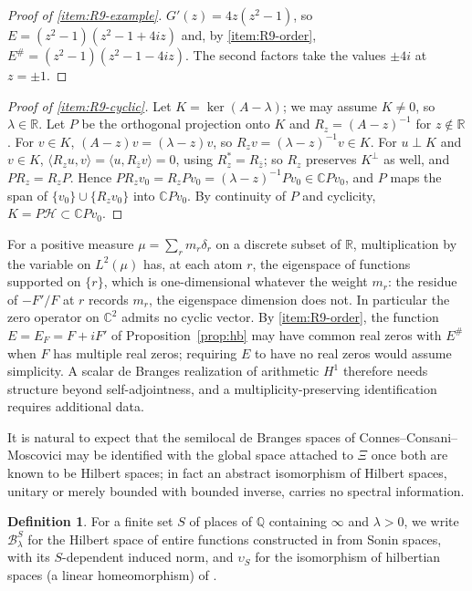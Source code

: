 \documentclass[11pt]{amsart}
\theoremstyle{plain}
\theoremstyle{definition}
\newtheorem{definition}[theorem]{Definition}
\theoremstyle{remark}
\numberwithin{equation}{section}
\newcommand{\C}{\mathbb{C}}
\newcommand{\R}{\mathbb{R}}
\newcommand{\Q}{\mathbb{Q}}
\newcommand{\cH}{\mathscr{H}}
\begin{document}
\begin{proof}[Proof of \ref{item:R9-example}]
$G'(z)=4z(z^2-1)$, so $E=(z^2-1)(z^2-1+4iz)$ and, by
\ref{item:R9-order}, $E^\#=(z^2-1)(z^2-1-4iz)$. The second factors take
the values $\pm4i$ at $z=\pm1$.
\end{proof}

\begin{proof}[Proof of \ref{item:R9-cyclic}]
Let $K=\ker(A-\lambda)$; we may assume $K\ne0$, so $\lambda\in\R$. Let
$P$ be the orthogonal projection onto $K$ and $R_z=(A-z)^{-1}$ for
$z\notin\R$. For $v\in K$, $(A-z)v=(\lambda-z)v$, so
$R_zv=(\lambda-z)^{-1}v\in K$. For $u\perp K$ and $v\in K$,
$\langle R_zu,v\rangle=\langle u,R_{\bar z}v\rangle=0$, using
$R_z^*=R_{\bar z}$; so $R_z$ preserves $K^\perp$ as well, and
$PR_z=R_zP$. Hence $PR_zv_0=R_zPv_0=(\lambda-z)^{-1}Pv_0\in\C Pv_0$,
and $P$ maps the span of $\{v_0\}\cup\{R_zv_0\}$ into $\C Pv_0$. By
continuity of $P$ and cyclicity, $K=P\cH\subset\C Pv_0$.
\end{proof}

For a positive measure $\mu=\sum_rm_r\delta_r$ on a discrete subset of
$\R$, multiplication by the variable on $L^2(\mu)$ has, at each atom $r$,
the eigenspace of functions supported on $\{r\}$, which is
one-dimensional whatever the weight $m_r$: the residue of $-F'/F$ at $r$
records $m_r$, the eigenspace dimension does not. In particular the zero
operator on $\C^2$ admits no cyclic vector. By \ref{item:R9-order}, the
function $E=E_F=F+iF'$ of Proposition~\ref{prop:hb} may have common real
zeros with $E^\#$ when $F$ has multiple real zeros; requiring $E$ to have
no real zeros would assume simplicity. A scalar de Branges realization
of arithmetic $H^1$ therefore needs structure beyond self-adjointness,
and a multiplicity-preserving identification requires additional data.

It is natural to expect that the semilocal de Branges spaces of
Connes--Consani--Moscovici may be identified with the global space
attached to $\Xi$ once both are known to be Hilbert spaces; in fact an
abstract isomorphism of Hilbert spaces, unitary or merely bounded with
bounded inverse, carries no spectral information.

\begin{definition}\label{def:ccm23-semilocal}
For a finite set $S$ of places of $\Q$ containing $\infty$ and
$\lambda>0$, we write $\mathcal B^S_\lambda$ for the Hilbert space of
entire functions constructed in
\cite[\S4.8]{ConnesConsaniMoscovici2024Prolate} from Sonin spaces,
with its $S$-dependent induced norm, and $\upsilon_S$ for the
isomorphism of hilbertian spaces (a linear homeomorphism) of
\cite[Proposition~4.8]{ConnesConsaniMoscovici2024Prolate}.
\end{definition}
\end{document}
